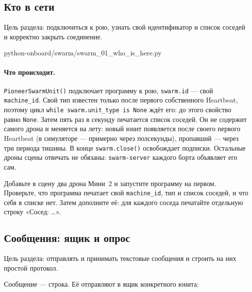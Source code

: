 \subsection{Кто в сети}
\label{sec:swarm-units}

Цель раздела: подключиться к рою, узнать свой идентификатор и список соседей и корректно закрыть соединение.

\begin{codefile}[python]{python-onboard/swarm/swarm_01_who_is_here.py}
\end{codefile}

\paragraph{Что происходит.} \verb|PioneerSwarmUnit()| подключает программу к рою, \verb|swarm.id| --- свой \texttt{machine\_id}. Свой тип известен только после первого собственного Heartbeat, поэтому цикл \verb|while swarm.unit_type is None| ждёт его: до этого свойство равно \verb|None|. Затем пять раз в секунду печатается список соседей. Он не содержит самого дрона и меняется на лету: новый юнит появляется после своего первого Heartbeat (в симуляторе --- примерно через полсекунды), пропавший --- через три периода тишины. В конце \verb|swarm.close()| освобождает подписки. Остальные дроны сцены отвечать не обязаны: \texttt{swarm-server} каждого борта объявляет его сам.

\begin{taskbox}
Добавьте в сцену два дрона Мини~2 и запустите программу на первом. Проверьте, что программа печатает свой \texttt{machine\_id}, тип и список соседей, и что себя в списке нет. Затем дополните её: для каждого соседа печатайте отдельную строку «Сосед: \ldots».
\end{taskbox}

\subsection{Сообщения: ящик и опрос}
\label{sec:swarm-messages}

Цель раздела: отправлять и принимать текстовые сообщения и строить на них простой протокол.

Сообщение --- строка. Её отправляют в ящик конкретного юнита:

